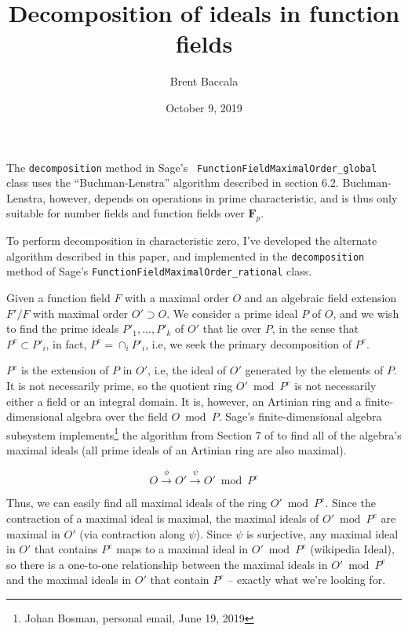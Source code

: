 \documentclass{article}
\newcommand{\Bold}[1]{\mathbf{#1}}
\newcommand{\FF}{\Bold{F}}
\begin{document}
\title{Decomposition of ideals in function fields}
\author{Brent Baccala}
\date{October 9, 2019}
\maketitle


The {\tt decomposition} method in Sage's {\tt
  FunctionFieldMaximalOrder\_global} class uses the ``Buchman-Lenstra''
algorithm described in \cite{cohen} section 6.2.  Buchman-Lenstra,
however, depends on operations in prime characteristic, and is thus
only suitable for number fields and function fields over $\FF_p$.

To perform decomposition in characteristic zero, I've developed
the alternate algorithm described in this paper, and implemented
in the {\tt decomposition} method of Sage's {\tt FunctionFieldMaximalOrder\_rational} class.

Given a function field $F$ with a maximal order $O$ and an
algebraic field extension $F'/F$ with maximal order $O' \supset O$.
We consider a prime ideal $P$ of $O$, and we wish to find the prime
ideals $P'_1,...,P'_k$ of $O'$ that lie over $P$, in the sense that
$P^e \subset P'_i$, in fact, $P^e = \cap_i P'_i$, i.e, we seek the
primary decomposition of $P^e$.

$P^e$ is the extension of $P$ in $O'$, i.e, the ideal of $O'$
generated by the elements of $P$.  It is not necessarily prime, so the
quotient ring $O' \bmod P^e$ is not necessarily either a field or an
integral domain.  It is, however, an Artinian ring and a
finite-dimensional algebra over the field $O \bmod P$.  Sage's
finite-dimensional algebra subsystem implements\footnote{Johan Bosman,
  personal email, June 19, 2019} the algorithm from Section 7 of
\cite{khuri} to find all of the algebra's maximal ideals (all
prime ideals of an Artinian ring are also maximal).

$$O \stackrel{\phi}{\rightarrow} O' \stackrel{\psi}{\rightarrow} O'\bmod P^e$$

Thus, we can easily find all maximal ideals of the ring $O' \bmod P^e$.  Since
the contraction of a maximal ideal is maximal, the maximal ideals of
$O'\bmod P^e$ are maximal in $O'$ (via contraction along $\psi$).  Since
$\psi$ is surjective, any maximal ideal in $O'$ that contains $P^e$ maps
to a maximal ideal in $O'\bmod P^e$ (wikipedia Ideal), so there is a one-to-one
relationship between the maximal ideals in $O'\bmod P^e$ and the maximal ideals in $O'$
that contain $P^e$ -- exactly what we're looking for.
\end{document}
